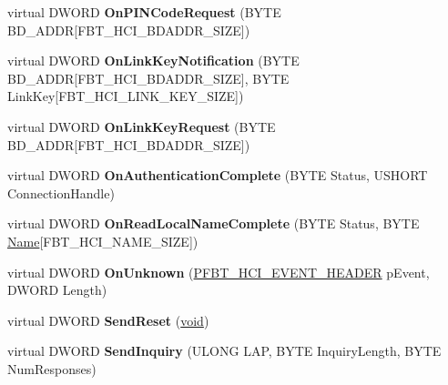 \begin{DoxyCompactItemize}
virtual D\+W\+O\+RD {\bfseries On\+P\+I\+N\+Code\+Request} (B\+Y\+TE B\+D\+\_\+\+A\+D\+DR\mbox{[}F\+B\+T\+\_\+\+H\+C\+I\+\_\+\+B\+D\+A\+D\+D\+R\+\_\+\+S\+I\+ZE\mbox{]})
\item 
\mbox{\label{class_c_hci_aad9badc542d41de9aa60cf6d6b20fc8c}} 
virtual D\+W\+O\+RD {\bfseries On\+Link\+Key\+Notification} (B\+Y\+TE B\+D\+\_\+\+A\+D\+DR\mbox{[}F\+B\+T\+\_\+\+H\+C\+I\+\_\+\+B\+D\+A\+D\+D\+R\+\_\+\+S\+I\+ZE\mbox{]}, B\+Y\+TE Link\+Key\mbox{[}F\+B\+T\+\_\+\+H\+C\+I\+\_\+\+L\+I\+N\+K\+\_\+\+K\+E\+Y\+\_\+\+S\+I\+ZE\mbox{]})
\item 
\mbox{\label{class_c_hci_a52532ed8bcbee4b1bfa1a8727abb4cb3}} 
virtual D\+W\+O\+RD {\bfseries On\+Link\+Key\+Request} (B\+Y\+TE B\+D\+\_\+\+A\+D\+DR\mbox{[}F\+B\+T\+\_\+\+H\+C\+I\+\_\+\+B\+D\+A\+D\+D\+R\+\_\+\+S\+I\+ZE\mbox{]})
\item 
\mbox{\label{class_c_hci_a82359c5a7c7873de3fc9ec7575dcab94}} 
virtual D\+W\+O\+RD {\bfseries On\+Authentication\+Complete} (B\+Y\+TE Status, U\+S\+H\+O\+RT Connection\+Handle)
\item 
\mbox{\label{class_c_hci_a08275af38a127795ecd4df4efa6cbfd4}} 
virtual D\+W\+O\+RD {\bfseries On\+Read\+Local\+Name\+Complete} (B\+Y\+TE Status, B\+Y\+TE \hyperlink{struct_name_rec__}{Name}\mbox{[}F\+B\+T\+\_\+\+H\+C\+I\+\_\+\+N\+A\+M\+E\+\_\+\+S\+I\+ZE\mbox{]})
\item 
\mbox{\label{class_c_hci_a717f66afa8d4640b7b05182a0143c6f8}} 
virtual D\+W\+O\+RD {\bfseries On\+Unknown} (\hyperlink{struct_f_b_t___h_c_i___e_v_e_n_t___h_e_a_d_e_r}{P\+F\+B\+T\+\_\+\+H\+C\+I\+\_\+\+E\+V\+E\+N\+T\+\_\+\+H\+E\+A\+D\+ER} p\+Event, D\+W\+O\+RD Length)
\item 
\mbox{\label{class_c_hci_a525931bf135ebc73ba14f74e8a2a4e85}} 
virtual D\+W\+O\+RD {\bfseries Send\+Reset} (\hyperlink{interfacevoid}{void})
\item 
\mbox{\label{class_c_hci_a06c9a90033f288c9d66df68583fc939b}} 
virtual D\+W\+O\+RD {\bfseries Send\+Inquiry} (U\+L\+O\+NG L\+AP, B\+Y\+TE Inquiry\+Length, B\+Y\+TE Num\+Responses)
\item 
\mbox{\label{class_c_hci_a75a2e34086fe4897657c3bc1173485ee}} 

\end{DoxyCompactItemize}
